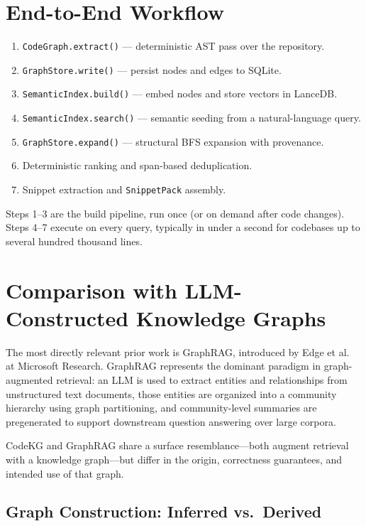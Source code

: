 \documentclass[10pt]{article}
\begin{document}
\section{End-to-End Workflow}

\begin{enumerate}
\item \texttt{CodeGraph.extract()} --- deterministic AST pass over the repository.
\item \texttt{GraphStore.write()} --- persist nodes and edges to SQLite.
\item \texttt{SemanticIndex.build()} --- embed nodes and store vectors in LanceDB.
\item \texttt{SemanticIndex.search()} --- semantic seeding from a natural-language
query.
\item \texttt{GraphStore.expand()} --- structural BFS expansion with provenance.
\item Deterministic ranking and span-based deduplication.
\item Snippet extraction and \texttt{SnippetPack} assembly.
\end{enumerate}

Steps 1--3 are the build pipeline, run once (or on demand after code changes).
Steps 4--7 execute on every query, typically in under a second for codebases up to
several hundred thousand lines.

\section{Comparison with LLM-Constructed Knowledge Graphs}
\label{sec:comparison}

The most directly relevant prior work is GraphRAG, introduced by Edge
et al.~\cite{edge2024graphrag} at Microsoft Research. GraphRAG represents the
dominant paradigm in graph-augmented retrieval: an LLM is used to extract entities
and relationships from unstructured text documents, those entities are organized into
a community hierarchy using graph partitioning, and community-level summaries are
pregenerated to support downstream question answering over large corpora.

CodeKG and GraphRAG share a surface resemblance---both augment retrieval with a
knowledge graph---but differ in the origin, correctness guarantees, and intended
use of that graph.

\subsection{Graph Construction: Inferred vs.\ Derived}
\end{document}
